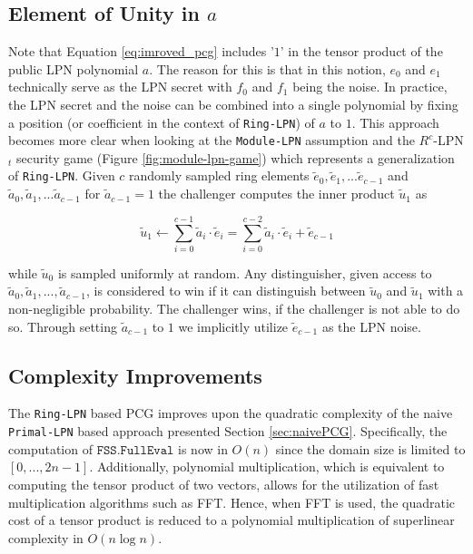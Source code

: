 \subsection{Element of Unity in $a$}
Note that Equation \ref{eq:imroved_pcg} includes '$1$' in the tensor product of the public LPN polynomial $a$. The reason for this is that in this notion, $e_0$ and $e_1$ technically serve as the LPN secret with $f_0$ and $f_1$ being the noise. In practice, the LPN secret and the noise can be combined into a single polynomial by fixing a position (or coefficient in the context of \texttt{Ring-LPN}) of $a$ to $1$. This approach becomes more clear when looking at the \texttt{Module-LPN} assumption and the $R^{c}$-LPN$_{t}$ security game (Figure \ref{fig:module-lpn-game}) which represents a generalization of \texttt{Ring-LPN}. Given $c$ randomly sampled ring elements $\tilde{e}_0, \tilde{e}_1, ... \tilde{e}_{c-1}$ and $\tilde{a}_0, \tilde{a}_1, ...\tilde{a}_{c-1}$ for $\tilde{a}_{c-1}=1$  the challenger computes the inner product $\tilde{u}_1$ as

\begin{equation}
\label{eq:inner_product_with_a_1}
\tilde{u}_{1} \leftarrow \sum_{i=0}^{c-1} \tilde{a}_{i} \cdot \tilde{e}_{i} = \sum_{i=0}^{c-2} \tilde{a}_{i} \cdot \tilde{e}_{i} + \tilde{e}_{c-1}
\end{equation}

while $\tilde{u}_0$ is sampled uniformly at random. Any distinguisher, given access to $\tilde{a}_0, \tilde{a}_1, ..., \tilde{a}_{c-1}$, is considered to win if it can distinguish between $\tilde{u}_0$ and $\tilde{u}_1$ with a non-negligible probability. The challenger wins, if the challenger is not able to do so. Through setting $\tilde{a}_{c-1}$ to $1$ we implicitly utilize $\tilde{e}_{c-1}$ as the LPN noise.


\subsection{Complexity Improvements}
The \texttt{Ring-LPN} based PCG improves upon the quadratic complexity of the naive \texttt{Primal-LPN} based approach presented Section \ref{sec:naivePCG}. Specifically, the computation of $\texttt{FSS.FullEval}$ is now in $O(n)$ since the domain size is limited to $[0, ..., 2n-1]$. Additionally, polynomial multiplication, which is equivalent to computing the tensor product of two vectors, allows for the utilization of fast multiplication algorithms such as FFT. Hence, when FFT is used, the quadratic cost of a tensor product is reduced to a polynomial multiplication of superlinear complexity in $O(n \log n)$.

